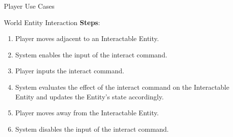 \documentclass[12pt]{report}
\begin{document}
\begin{section}{Player Use Cases}
\begin{subsection}{World Entity Interaction}
      \textbf{Steps}:        
      \begin{enumerate}
        \item Player moves adjacent to an Interactable Entity.
        \item System enables the input of the interact command.
        \item Player inputs the interact command.
        \item System evaluates the effect of the interact command on the
        Interactable Entity and updates the Entity's state accordingly.
        \item Player moves away from the Interactable Entity.
        \item System disables the input of the interact command.
      \end{enumerate}
    \end{subsection}
  \end{section}
\end{document}
